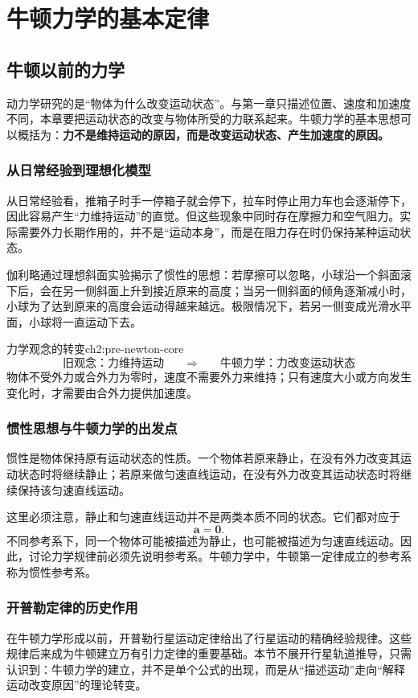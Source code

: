 
\chapter{牛顿力学的基本定律}

\section{牛顿以前的力学}

动力学研究的是“物体为什么改变运动状态”。与第一章只描述位置、速度和加速度不同，本章要把运动状态的改变与物体所受的力联系起来。牛顿力学的基本思想可以概括为：\textbf{力不是维持运动的原因，而是改变运动状态、产生加速度的原因。}

\subsection{从日常经验到理想化模型}

从日常经验看，推箱子时手一停箱子就会停下，拉车时停止用力车也会逐渐停下，因此容易产生“力维持运动”的直觉。但这些现象中同时存在摩擦力和空气阻力。实际需要外力长期作用的，并不是“运动本身”，而是在阻力存在时仍保持某种运动状态。

伽利略通过理想斜面实验揭示了惯性的思想：若摩擦可以忽略，小球沿一个斜面滚下后，会在另一侧斜面上升到接近原来的高度；当另一侧斜面的倾角逐渐减小时，小球为了达到原来的高度会运动得越来越远。极限情况下，若另一侧变成光滑水平面，小球将一直运动下去。

\begin{knowledge}{力学观念的转变}{ch2:pre-newton-core}
\[
    \text{旧观念：力维持运动}
    \qquad \Longrightarrow \qquad
    \text{牛顿力学：力改变运动状态}
\]
物体不受外力或合外力为零时，速度不需要外力来维持；只有速度大小或方向发生变化时，才需要由合外力提供加速度。
\end{knowledge}

\subsection{惯性思想与牛顿力学的出发点}

惯性是物体保持原有运动状态的性质。一个物体若原来静止，在没有外力改变其运动状态时将继续静止；若原来做匀速直线运动，在没有外力改变其运动状态时将继续保持该匀速直线运动。

这里必须注意，静止和匀速直线运动并不是两类本质不同的状态。它们都对应于
\[
    \boldsymbol a=\boldsymbol 0.
\]
不同参考系下，同一个物体可能被描述为静止，也可能被描述为匀速直线运动。因此，讨论力学规律前必须先说明参考系。牛顿力学中，牛顿第一定律成立的参考系称为惯性参考系。

\subsection{开普勒定律的历史作用}

在牛顿力学形成以前，开普勒行星运动定律给出了行星运动的精确经验规律。这些规律后来成为牛顿建立万有引力定律的重要基础。本节不展开行星轨道推导，只需认识到：牛顿力学的建立，并不是单个公式的出现，而是从“描述运动”走向“解释运动改变原因”的理论转变。
